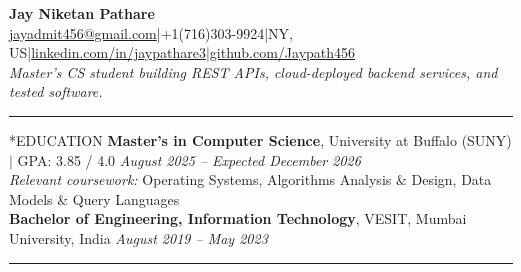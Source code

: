 \documentclass[10pt, letterpaper]{article}
\makeatletter
\newcommand{\sectiondivider}{\vspace{0.62em}\hrule\vspace{0.54em}}
\newcommand{\rolegap}{\vspace{6.6pt}}
\renewcommand{\section}{\@startsection{section}{1}{\z@}{-0.46em \@plus -0.1ex \@minus -0.1ex}{0.36ex \@plus 0.1ex}{\normalfont\large\bfseries}}
\makeatother
\begin{document}
\begin{center}
\textbf{\Large Jay Niketan Pathare} \\
\rolegap
\href{mailto:jayadmit456@gmail.com}{jayadmit456@gmail.com}\hspace{0.5em}|\hspace{0.5em}+1(716)303-9924\hspace{0.5em}|\hspace{0.5em}NY, US\hspace{0.5em}|\hspace{0.5em}\href{https://www.linkedin.com/in/jaypathare3}{linkedin.com/in/jaypathare3}\hspace{0.5em}|\hspace{0.5em}\href{https://github.com/Jaypath456}{github.com/Jaypath456} \\
\textit{Master's CS student building REST APIs, cloud-deployed backend services, and tested software.}
\end{center}
\sectiondivider
\section*{EDUCATION}
\noindent\textbf{Master's in Computer Science}, University at Buffalo (SUNY) $|$ GPA: 3.85 / 4.0 \hfill \textit{August 2025 -- Expected December 2026} \\
\textit{Relevant coursework:} Operating Systems, Algorithms Analysis \& Design, Data Models \& Query Languages \\
\noindent\textbf{Bachelor of Engineering, Information Technology}, VESIT, Mumbai University, India \hfill \textit{August 2019 -- May 2023}
\sectiondivider
\end{document}

